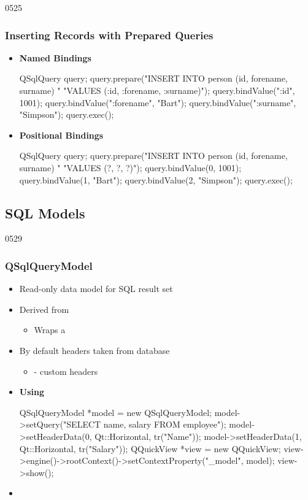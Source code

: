 \begin{slide}[fragile]{0525}\frametitle{Inserting Records with Prepared Queries}
\begin{itemize}
\item \textbf{Named Bindings}
  \begin{cpp}
QSqlQuery query;
query.prepare("INSERT INTO person (id, forename, surname) "
              "VALUES (:id, :forename, :surname)");
    query.bindValue(":id", 1001);
    query.bindValue(":forename", "Bart");
    query.bindValue(":surname", "Simpson");
    query.exec();  
\end{cpp}
\item \textbf{Positional Bindings}
  \begin{cpp}
QSqlQuery query;
query.prepare("INSERT INTO person (id, forename, surname) "
              "VALUES (?, ?, ?)");
    query.bindValue(0, 1001);
    query.bindValue(1, "Bart");
    query.bindValue(2, "Simpson");
    query.exec();
  \end{cpp}
\end{itemize}
\end{slide}

\subsection{SQL Models}

\begin{slide}[fragile]{0529}\frametitle{QSqlQueryModel}
\begin{itemize}
\item Read-only data model for SQL result set
\item Derived from 
  \begin{itemize}
  \item Wraps a 
  \end{itemize}
\item By default headers taken from database
  \begin{itemize}
  \item {} - custom headers
  \end{itemize}
\item \textbf{Using }
  \begin{cpp}
QSqlQueryModel *model = new QSqlQueryModel;
model->setQuery("SELECT name, salary FROM employee");
model->setHeaderData(0, Qt::Horizontal, tr("Name"));
model->setHeaderData(1, Qt::Horizontal, tr("Salary"));
QQuickView *view = new QQuickView;
view->engine()->rootContext()->setContextProperty("_model", model);
view->show();    
  \end{cpp}
\item {}
\end{itemize}
\end{slide}

